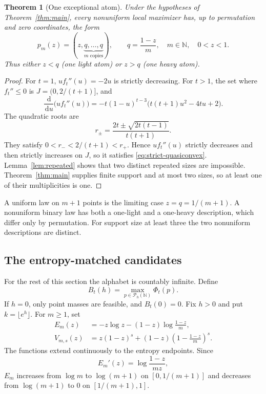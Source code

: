 \documentclass[11pt]{article}
\numberwithin{equation}{section}
\newtheorem{theorem}{Theorem}[section]
\newcommand{\dd}{\,\mathrm d}
\begin{document}
\begin{theorem}[One exceptional atom]\label{thm:exceptional}
Under the hypotheses of Theorem~\ref{thm:main}, every nonuniform local
maximizer has, up to permutation and zero coordinates, the form
\begin{equation}\label{eq:exceptional-form}
 p_m(z)=\left(z,\underbrace{q,\ldots,q}_{m\text{ copies}}\right),
 \qquad q=\frac{1-z}{m},\quad m\in\mathbb N,\quad 0<z<1.
\end{equation}
Thus either $z<q$ (one light atom) or $z>q$ (one heavy atom).
\end{theorem}
\begin{proof}
For $t=1$, $u f_t''(u)=-2u$ is strictly decreasing. For $t>1$, the set
where $f_t''\le0$ is $J=(0,2/(t+1)]$, and
\[
 \frac{\dd}{\dd u}\bigl(uf_t''(u)\bigr)
 =-t(1-u)^{t-3}\bigl(t(t+1)u^2-4tu+2\bigr).
\]
The quadratic roots are
\[
 r_\pm=\frac{2t\pm\sqrt{2t(t-1)}}{t(t+1)}.
\]
They satisfy $0<r_-<2/(t+1)<r_+$. Hence $uf_t''(u)$ strictly decreases
and then strictly increases on $J$, so it satisfies
\eqref{eq:strict-quasiconvex}. Lemma~\ref{lem:repeated} shows that two
distinct repeated sizes are impossible. Theorem~\ref{thm:main} supplies
finite support and at most two sizes, so at least one of their
multiplicities is one.
\end{proof}

A uniform law on $m+1$ points is the limiting case $z=q=1/(m+1)$.
A nonuniform binary law has both a one-light and a one-heavy description,
which differ only by permutation. For support size at least three the two
nonuniform descriptions are distinct.

\subsection{The entropy-matched candidates}
For the rest of this section the alphabet is countably infinite. Define
\[
 B_t(h)=\max_{p\in\mathcal P_h(\mathbb N)}\Phi_t(p).
\]
If $h=0$, only point masses are feasible, and $B_t(0)=0$. Fix $h>0$ and put
$k=\lfloor e^h\rfloor$. For $m\ge1$, set
\begin{equation}\label{eq:branch-functions}
 \begin{aligned}
 E_m(z)&=-z\log z-(1-z)\log\frac{1-z}{m},\\
 V_{m,s}(z)&=z(1-z)^s+(1-z)\left(1-\frac{1-z}{m}\right)^s.
 \end{aligned}
\end{equation}
The functions extend continuously to the entropy endpoints. Since
\begin{equation}\label{eq:entropy-branch-derivative}
 E_m'(z)=\log\frac{1-z}{mz},
\end{equation}
$E_m$ increases from $\log m$ to $\log(m+1)$ on $[0,1/(m+1)]$ and
decreases from $\log(m+1)$ to $0$ on $[1/(m+1),1]$.
\end{document}
